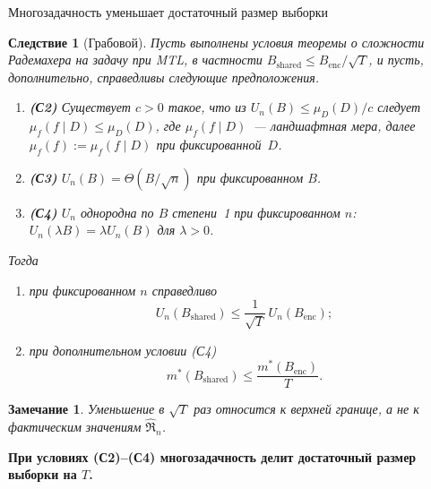 \documentclass[9pt,pdf,hyperref={unicode}]{beamer}
\newtheorem{rusremark}{Замечание}
\newtheorem{ruscorollary}{Следствие}
\newcommand{\key}[1]{\par\vspace{0.5ex}\noindent\textbf{\color{darkgreen}#1}}
\begin{document}
\begin{frame}{Многозадачность уменьшает достаточный размер выборки}
\justifying
\scriptsize
\begin{ruscorollary}[Грабовой]
    Пусть выполнены условия теоремы о сложности Радемахера на задачу при MTL, в частности $B_{\mathrm{shared}}\le B_{\mathrm{enc}}/\sqrt{T}$, и пусть, дополнительно, справедливы следующие предположения.
    \begin{enumerate}[1)]
        \item \textbf{(С2)} Существует $c>0$ такое, что из $U_n(B)\le\mu_D(D)/c$ следует $\mu_f(f\mid D)\le\mu_D(D)$, где $\mu_f(f\mid D)$~--- ландшафтная мера, далее $\mu_f(f):=\mu_f(f\mid D)$ при фиксированной~$D$.
        \item \textbf{(С3)} $U_n(B)=\Theta(B/\sqrt{n})$ при фиксированном $B$.
        \item \textbf{(С4)} $U_n$ однородна по $B$ степени~1 при фиксированном $n$: $U_n(\lambda B)=\lambda U_n(B)$ для $\lambda>0$.
    \end{enumerate}
    Тогда
    \begin{enumerate}[1)]
        \item при фиксированном $n$ справедливо
        \[
            U_n(B_{\mathrm{shared}})\le\frac{1}{\sqrt{T}}\,U_n(B_{\mathrm{enc}});
        \]
        \item при дополнительном условии (С4)
        \[
            m^*(B_{\mathrm{shared}})\le\frac{m^*(B_{\mathrm{enc}})}{T}.
        \]
    \end{enumerate}
\end{ruscorollary}
\vspace{-2pt}
\begin{rusremark}
    Уменьшение в $\sqrt{T}$ раз относится к верхней границе, а не к фактическим значениям $\widehat{\mathfrak R}_n$.
\end{rusremark}
\key{При условиях (С2)--(С4) многозадачность делит достаточный размер выборки на $T$.}
\end{frame}
\end{document}
